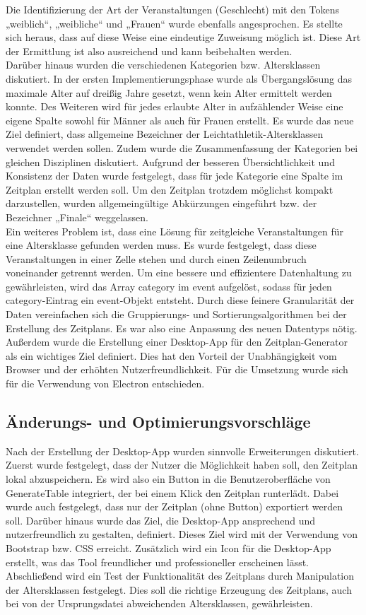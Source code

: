 Die Identifizierung der Art der Veranstaltungen (Geschlecht) mit den Tokens „weiblich“, „weibliche“ und „Frauen“ wurde ebenfalls angesprochen. Es stellte sich heraus, dass auf diese Weise eine eindeutige Zuweisung möglich ist. Diese Art der Ermittlung ist also ausreichend und kann beibehalten werden.\\
Darüber hinaus wurden die verschiedenen Kategorien bzw. Altersklassen diskutiert. In der ersten Implementierungsphase wurde als Übergangslösung das maximale Alter auf dreißig Jahre gesetzt, wenn kein Alter ermittelt werden konnte. Des Weiteren wird für jedes erlaubte Alter in aufzählender Weise eine eigene Spalte sowohl für Männer als auch für Frauen erstellt. Es wurde das neue Ziel definiert, dass allgemeine Bezeichner der Leichtathletik-Altersklassen verwendet werden sollen. Zudem wurde die Zusammenfassung der Kategorien bei gleichen Disziplinen diskutiert. Aufgrund der besseren Übersichtlichkeit und Konsistenz der Daten wurde festgelegt, dass für jede Kategorie eine Spalte im Zeitplan erstellt werden soll. Um den Zeitplan trotzdem möglichst kompakt darzustellen, wurden allgemeingültige Abkürzungen eingeführt bzw. der Bezeichner „Finale“ weggelassen. \\
Ein weiteres Problem ist, dass eine Lösung für zeitgleiche Veranstaltungen für eine Altersklasse gefunden werden muss. Es wurde festgelegt, dass diese Veranstaltungen in einer Zelle stehen und durch einen Zeilenumbruch voneinander getrennt werden. Um eine bessere und effizientere Datenhaltung zu gewährleisten, wird das Array category im event aufgelöst, sodass für jeden category-Eintrag ein event-Objekt entsteht. Durch diese feinere Granularität der Daten vereinfachen sich die Gruppierungs- und Sortierungsalgorithmen bei der Erstellung des Zeitplans. Es war also eine Anpassung des neuen Datentyps nötig.\\
Außerdem wurde die Erstellung einer Desktop-App für den Zeitplan-Generator als ein wichtiges Ziel definiert. Dies hat den Vorteil der Unabhängigkeit vom Browser und der erhöhten Nutzerfreundlichkeit. Für die Umsetzung wurde sich für die Verwendung von Electron entschieden.

\subsection{Änderungs- und Optimierungsvorschläge}
Nach der Erstellung der Desktop-App wurden sinnvolle Erweiterungen diskutiert. Zuerst wurde festgelegt, dass der Nutzer die Möglichkeit haben soll, den Zeitplan lokal abzuspeichern. Es wird also ein Button in die Benutzeroberfläche von GenerateTable integriert, der bei einem Klick den Zeitplan runterlädt. Dabei wurde auch festgelegt, dass nur der Zeitplan (ohne Button) exportiert werden soll.
Darüber hinaus wurde das Ziel, die Desktop-App ansprechend und nutzerfreundlich zu gestalten, definiert. Dieses Ziel wird mit der Verwendung von Bootstrap bzw. CSS erreicht. Zusätzlich wird ein Icon für die Desktop-App erstellt, was das Tool freundlicher und professioneller erscheinen lässt.
Abschließend wird ein Test der Funktionalität des Zeitplans durch Manipulation der Altersklassen festgelegt. Dies soll die richtige Erzeugung des Zeitplans, auch bei von der Ursprungsdatei abweichenden Altersklassen, gewährleisten.

